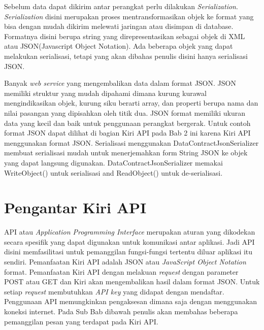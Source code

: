\hspace{0.5cm} Sebelum data dapat dikirim antar perangkat perlu dilakukan \textit{Serialization}. \textit{Serialization} disini merupakan proses mentransformasikan objek ke format yang bisa dengan mudah dikirim melewati jaringan atau disimpan di database. Formatnya disini berupa string yang direpresentasikan sebagai objek di XML atau JSON(Javascript Object Notation). Ada beberapa objek yang dapat melakukan serialisasi, tetapi yang akan dibahas penulis disini hanya serialisasi JSON. 

\hspace{0.5cm} Banyak \textit{web service} yang mengembalikan data dalam format JSON. JSON memiliki struktur yang mudah dipahami dimana kurung kurawal mengindikasikan objek, kurung siku berarti array, dan properti berupa nama dan nilai pasangan yang dipisahkan oleh titik dua. JSON format memiliki ukuran data yang kecil dan baik untuk penggunaan perangkat bergerak. Untuk contoh format JSON dapat dilihat di bagian Kiri API pada Bab 2 ini karena Kiri API menggunakan format JSON. Serialisasi menggunakan DataContractJsonSerializer membuat serialisasi mudah untuk menerjemahkan form String JSON ke objek yang dapat langsung digunakan. DataContractJsonSerializer memakai WriteObject() untuk serialisasi and ReadObject() untuk de-serialisasi.

\section{Pengantar Kiri API}
\label{sec:Pengantar Kiri API}
\hspace{0.5cm} API atau \textit{Application Programming Interface} merupakan aturan yang dikodekan secara spesifik yang dapat digunakan untuk komunikasi antar aplikasi. Jadi API disini memfasilitasi untuk pemanggilan fungsi-fungsi tertentu diluar aplikasi itu sendiri. Pemanfaatan Kiri API adalah JSON atau \textit{JavaScript Object Notation} format. Pemanfaatan Kiri API dengan melakuan \textit{request} dengan parameter POST atau GET dan Kiri akan mengembalikan hasil dalam format JSON. Untuk setiap \textit{request} membutuhkan \textit{API key} yang didapat dengan mendaftar\cite{Kiri}. Penggunaan API memungkinkan pengaksesan dimana saja dengan menggunakan koneksi internet. Pada Sub Bab dibawah penulis akan membahas beberapa pemanggilan pesan yang terdapat pada Kiri API.

